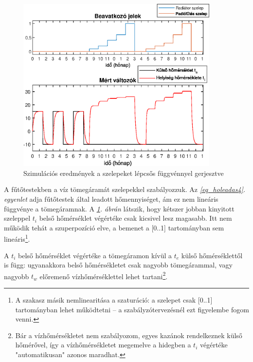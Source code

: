 \begin{figure}[H]
	\centering
	\includegraphics[trim=0 0 0 0, clip,width=0.9\textwidth]{figures/valve-stair}
	\caption{Szimulációs eredmények a szelepeket lépcsős függvénnyel gerjesztve}
	\label{fig:valve-stair}
\end{figure}

A fűtőtestekben a víz tömegáramát szelepekkel szabályozzuk. Az \textit{\ref{eq_holeadas4}. egyenlet} adja fűtőtestek által leadott hőmennyiséget, ám ez nem lineáris függvénye a tömegáramnak. A \textit{\ref{fig:valve-stair}. ábrán} látszik, hogy kétszer jobban kinyitott szeleppel $t_i$ belső hőmérséklet végértéke csak kicsivel lesz magasabb. Itt nem működik tehát a szuperpozíció elve, a bemenet a [0..1] tartományban sem lineáris\footnote{A szakasz másik nemlinearitása a szaturáció: a szelepet csak [0..1] tartományban lehet működtetni -- a szabályzótervezésnél ezt figyelembe fogom venni.}.

A $t_i$ belső hőmérséklet végértéke a tömegáramon kívül a $t_e$ külső hőmérséklettől is függ: ugyanakkora belső hőmérsékletet csak nagyobb tömegárammal, vagy nagyobb $t_w$ előremenő vízhőmérséklettel lehet tartani\footnote{Bár a vízhőmérsékletet nem szabályozom, egyes kazánok rendelkeznek külső hőmérővel, így a vízhőmérsékletet megemelve a hidegben a $t_i$ végértéke "automatikusan" azonos maradhat.}. 

